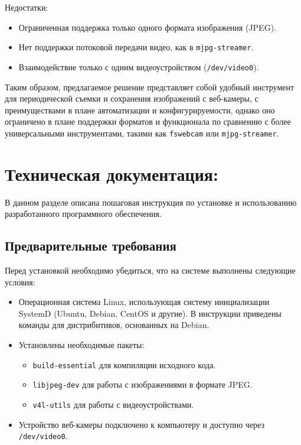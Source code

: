 \documentclass[12pt]{article}
\begin{document}
Недостатки:
\begin{itemize}
    \item Ограниченная поддержка только одного формата изображения (JPEG).
    \item Нет поддержки потоковой передачи видео, как в \texttt{mjpg-streamer}.
    \item Взаимодействие только с одним видеоустройством (\texttt{/dev/video0}).
\end{itemize}

Таким образом, предлагаемое решение представляет собой удобный инструмент для периодической съемки и сохранения изображений с веб-камеры, с преимуществами в плане автоматизации и конфигурируемости, однако оно ограничено в плане поддержки форматов и функционала по сравнению с более универсальными инструментами, такими как \texttt{fswebcam} или \texttt{mjpg-streamer}.

\section*{Техническая документация:}

В данном разделе описана пошаговая инструкция по установке и использованию разработанного программного обеспечения.

\subsection*{Предварительные требования}
Перед установкой необходимо убедиться, что на системе выполнены следующие условия:
\begin{itemize}
    \item Операционная система Linux, использующая систему инициализации SystemD (Ubuntu, Debian, CentOS и другие). В инструкции приведены команды для дистрибитивов, основанных на Debian.
    \item Установлены необходимые пакеты:
    \begin{itemize}
        \item \texttt{build-essential} для компиляции исходного кода.
        \item \texttt{libjpeg-dev} для работы с изображениями в формате JPEG.
        \item \texttt{v4l-utils} для работы с видеоустройствами.
    \end{itemize}
    \item Устройство веб-камеры подключено к компьютеру и доступно через \texttt{/dev/video0}.
\end{itemize}
\end{document}
